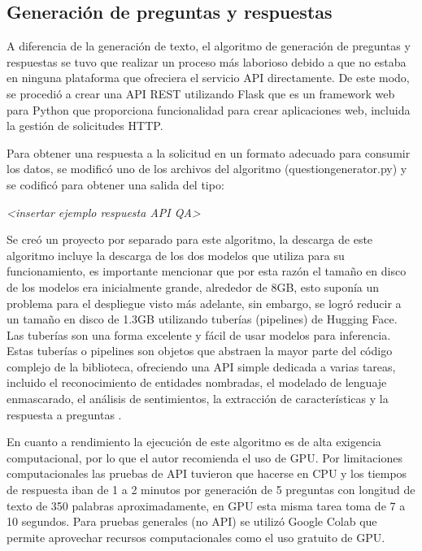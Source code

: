 \documentclass[../Main.tex]{subfiles}
\begin{document}
        \subsection{Generación de preguntas y respuestas}
            \begin{justify}
            A diferencia de la generación de texto, el algoritmo de generación de preguntas y respuestas se tuvo que realizar un proceso más laborioso debido a que no estaba en ninguna plataforma que ofreciera el servicio API directamente. De este modo, se procedió a crear una API REST utilizando Flask que es un framework web para Python que proporciona funcionalidad para crear aplicaciones web, incluida la gestión de solicitudes HTTP.
            
            Para obtener una respuesta a la solicitud en un formato adecuado para consumir los datos, se modificó uno de los archivos del algoritmo (questiongenerator.py) y se codificó para obtener una salida del tipo:
            
            \begin{center}
            \textit{<insertar ejemplo respuesta API QA>}
            \end{center}
            
            Se creó un proyecto por separado para este algoritmo, la descarga de este algoritmo incluye la descarga de los dos modelos que utiliza para su funcionamiento, es importante mencionar que por esta razón el tamaño en disco de los modelos era inicialmente grande, alrededor de 8GB, esto suponía un problema para el despliegue visto más adelante, sin embargo, se logró reducir a un tamaño en disco de 1.3GB utilizando tuberías (pipelines) de Hugging Face. Las tuberías son una forma excelente y fácil de usar modelos para inferencia. Estas tuberías o pipelines son objetos que abstraen la mayor parte del código complejo de la biblioteca, ofreciendo una API simple dedicada a varias tareas, incluido el reconocimiento de entidades nombradas, el modelado de lenguaje enmascarado, el análisis de sentimientos, la extracción de características y la respuesta a preguntas \cite{53}. %
            \end{justify}
            
            \begin{justify}
            En cuanto a rendimiento la ejecución de este algoritmo es de alta exigencia computacional, por lo que el autor recomienda el uso de GPU. Por limitaciones computacionales las pruebas de API tuvieron que hacerse en CPU y los tiempos de respuesta iban de 1 a 2 minutos por generación de 5 preguntas con longitud de texto de 350 palabras aproximadamente, en GPU esta misma tarea toma de 7 a 10 segundos. Para pruebas generales (no API) se utilizó Google Colab que permite aprovechar recursos computacionales como el uso gratuito de GPU.
            \end{justify}
            
\end{document}
